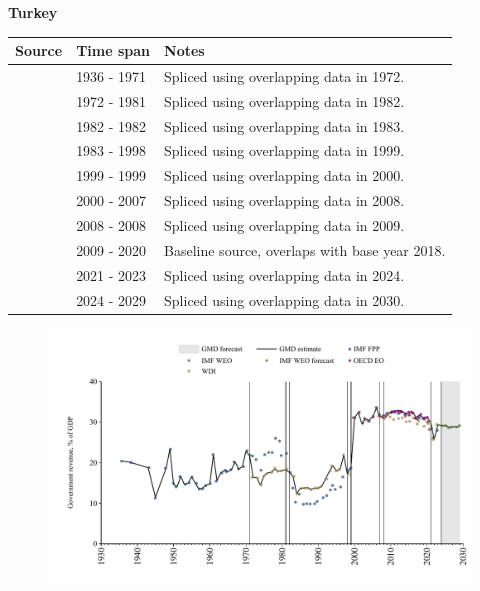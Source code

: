 \documentclass[12pt,a4paper,landscape]{article}
\begin{document}
\begin{adjustbox}{max totalsize={\paperwidth}{\paperheight},center}
\begin{minipage}[t][\textheight][t]{\textwidth}
\vspace*{0.5cm}
{}
\begin{center}
{\Large\bfseries Turkey}
\end{center}
\vspace{0.5cm}
\begin{table}[H]
\centering
\small
\begin{tabular}{|l|l|l|}
\hline
\textbf{Source} & \textbf{Time span} & \textbf{Notes} \\
\hline
\rowcolor{white}\cite{IMF_FPP}& 1936 - 1971 &Spliced using overlapping data in 1972.\\
\rowcolor{lightgray}\cite{WDI}& 1972 - 1981 &Spliced using overlapping data in 1982.\\
\rowcolor{white}\cite{IMF_FPP}& 1982 - 1982 &Spliced using overlapping data in 1983.\\
\rowcolor{lightgray}\cite{WDI}& 1983 - 1998 &Spliced using overlapping data in 1999.\\
\rowcolor{white}\cite{IMF_FPP}& 1999 - 1999 &Spliced using overlapping data in 2000.\\
\rowcolor{lightgray}\cite{IMF_WEO}& 2000 - 2007 &Spliced using overlapping data in 2008.\\
\rowcolor{white}\cite{WDI}& 2008 - 2008 &Spliced using overlapping data in 2009.\\
\rowcolor{lightgray}\cite{OECD_EO}& 2009 - 2020 &Baseline source, overlaps with base year 2018.\\
\rowcolor{white}\cite{WDI}& 2021 - 2023 &Spliced using overlapping data in 2024.\\
\rowcolor{lightgray}\cite{IMF_WEO_forecast}& 2024 - 2029 &Spliced using overlapping data in 2030.\\
\hline
\end{tabular}
\end{table}
\begin{figure}[H]
\centering
\includegraphics[width=\textwidth,height=0.6\textheight,keepaspectratio]{graphs/TUR_govrev_GDP.pdf}
\end{figure}
\end{minipage}
\end{adjustbox}
\end{document}
